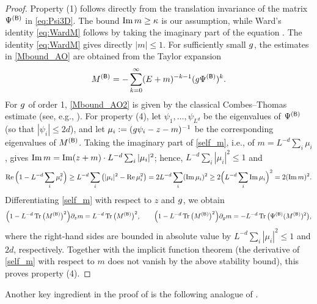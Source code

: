 \begin{proof}
Property (1) follows directly from the translation invariance of the matrix $\Psi^{({\mathsf{B}})}$ in \eqref{eq:Psi3D}. The bound $\operatorname{{\mathrm{Im}}} m \ge \kappa$ is our assumption, while Ward's identity \eqref{eq:WardM} follows by taking the imaginary part of the equation . The identity \eqref{eq:WardM} gives directly $|m|\le 1$. 
For sufficiently small $g$, the estimates in \eqref{Mbound_AO} are obtained from the Taylor expansion 
\[ M^{({\mathsf{B}})} = -\sum_{k=0}^\infty (E+m)^{-k-1}(g \Psi^{({\mathsf{B}})})^k.\]
For $g$ of order 1, \eqref{Mbound_AO2} is given by the classical Combes--Thomas estimate (see, e.g., \cite[Theorem 10.5]{Aizenman_book}).
For property (4), let $\psi_1,\ldots,\psi_{L^d}$ be the eigenvalues of $\Psi^{({\mathsf{B}})}$ (so that $|\psi_i|\le 2d$), and let $\mu_i:=(g\psi_i-z-m)^{-1}$ be the corresponding eigenvalues of $M^{({\mathsf{B}})}$. Taking the imaginary part of \eqref{self_m}, i.e., of $m=L^{-d}\sum_i\mu_i$, gives $\operatorname{{\mathrm{Im}}} m=\operatorname{{\mathrm{Im}}}(z+m)\cdot L^{-d}\sum_i|\mu_i|^2$; hence, $L^{-d}\sum_i|\mu_i|^2\le 1$ and
\[ \operatorname{{\mathrm{Re}}}\Big(1-L^{-d}\sum_i\mu_i^2\Big)\ge L^{-d}\sum_i\big(|\mu_i|^2-\operatorname{{\mathrm{Re}}} \mu_i^2\big)=2L^{-d}\sum_i(\operatorname{{\mathrm{Im}}}\mu_i)^2\ge 2\Big(L^{-d}\sum_i\operatorname{{\mathrm{Im}}}\mu_i\Big)^2=2(\operatorname{{\mathrm{Im}}} m)^2 . \]
Differentiating \eqref{self_m} with respect to $z$ and $g$, we obtain
\[ \Big(1-L^{-d}\operatorname{Tr}\big(M^{({\mathsf{B}})}\big)^2\Big)\partial_z m=L^{-d}\operatorname{Tr}\big(M^{({\mathsf{B}})}\big)^2,\qquad \Big(1-L^{-d}\operatorname{Tr}\big(M^{({\mathsf{B}})}\big)^2\Big)\partial_{g} m=-L^{-d}\operatorname{Tr}\big(\Psi^{({\mathsf{B}})}(M^{({\mathsf{B}})})^2\big), \]
where the right-hand sides are bounded in absolute value by $L^{-d}\sum_i|\mu_i|^2\le 1$ and $2d$, respectively. Together with the implicit function theorem (the derivative of \eqref{self_m} with respect to $m$ does not vanish by the above stability bound), this proves property (4).
\end{proof}

Another key ingredient in the proof of  is the following analogue of . 

